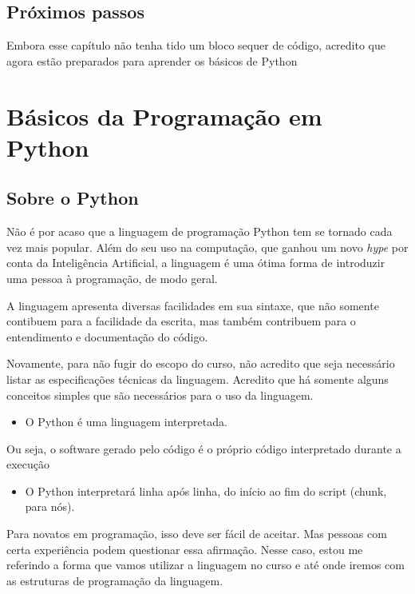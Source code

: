 \documentclass[11pt, brazilian]{article}
\providecommand{\tightlist}{%
      \setlength{\itemsep}{0pt}\setlength{\parskip}{0pt}}
\begin{document}
    \hypertarget{pruxf3ximos-passos}{%
\subsection{Próximos passos}\label{pruxf3ximos-passos}}

Embora esse capítulo não tenha tido um bloco sequer de código, acredito
que agora estão preparados para aprender os básicos de Python

    \hypertarget{buxe1sicos-da-programauxe7uxe3o-em-python}{%
\section{Básicos da Programação em
Python}\label{buxe1sicos-da-programauxe7uxe3o-em-python}}

\hypertarget{sobre-o-python}{%
\subsection{Sobre o Python}\label{sobre-o-python}}

Não é por acaso que a linguagem de programação Python tem se tornado
cada vez mais popular. Além do seu uso na computação, que ganhou um novo
\emph{hype} por conta da Inteligência Artificial, a linguagem é uma
ótima forma de introduzir uma pessoa à programação, de modo geral.

A linguagem apresenta diversas facilidades em sua sintaxe, que não
somente contibuem para a facilidade da escrita, mas também contribuem
para o entendimento e documentação do código.

Novamente, para não fugir do escopo do curso, não acredito que seja
necessário listar as especificações técnicas da linguagem. Acredito que
há somente alguns conceitos simples que são necessários para o uso da
linguagem.

\begin{itemize}
\tightlist
\item
  O Python é uma linguagem interpretada.
\end{itemize}

Ou seja, o software gerado pelo código é o próprio código interpretado
durante a execução

\begin{itemize}
\tightlist
\item
  O Python interpretará linha após linha, do início ao fim do script
  (chunk, para nós).
\end{itemize}

Para novatos em programação, isso deve ser fácil de aceitar. Mas pessoas
com certa experiência podem questionar essa afirmação. Nesse caso, estou
me referindo a forma que vamos utilizar a linguagem no curso e até onde
iremos com as estruturas de programação da linguagem.
\end{document}
